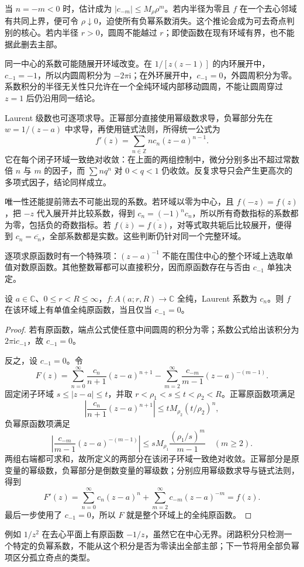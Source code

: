 当 \(n=-m<0\) 时，估计成为 \(|c_{-m}|\le M_\rho\rho^m\)。若内半径为零且 \(f\) 在一个去心邻域有共同上界，便可令 \(\rho\downarrow0\)，迫使所有负幂系数消失。这个推论会成为可去奇点判别的核心。若内半径 \(r>0\)，圆周不能越过 \(r\)；即使函数在现有环域有界，也不能据此删去主部。

\ProseParagraphBreak

同一中心的系数可能随展开环域改变。在 \(1/[z(z-1)]\) 的内环展开中，\(c_{-1}=-1\)，所以内圆周积分为 \(-2\pi\mathrm{i}\)；在外环展开中，\(c_{-1}=0\)，外圆周积分为零。系数积分的半径无关性只允许在一个全纯环域内部移动圆周，不能让圆周穿过 \(z=1\) 后仍沿用同一结论。

\ProseParagraphBreak

Laurent 级数也可逐项求导。正幂部分直接使用幂级数求导，负幂部分先在 \(w=1/(z-a)\) 中求导，再使用链式法则，所得统一公式为
\[
 f'(z)=\sum_{n\in\mathbb Z}n c_n(z-a)^{n-1}.
\]
它在每个闭子环域一致绝对收敛：在上面的两组控制中，微分分别多出不超过常数倍 \(n\) 与 \(m\) 的因子，而 \(\sum n q^n\) 对 \(0<q<1\) 仍收敛。反复求导只会产生更高次的多项式因子，结论同样成立。

\ProseParagraphBreak

唯一性还能提前筛去不可能出现的系数。若环域以零为中心，且 \(f(-z)=f(z)\)，把 \(-z\) 代入展开并比较系数，得到 \(c_n=(-1)^n c_n\)，所以所有奇数指标的系数都为零，包括负的奇数指标。若 \(f(\overline z)=\overline{f(z)}\)，对等式取共轭后比较展开，便得到 \(c_n=\overline{c_n}\)，全部系数都是实数。这些判断仍针对同一个完整环域。

\ProseParagraphBreak

逐项求原函数时有一个特殊项：\((z-a)^{-1}\) 不能在围住中心的整个环域上选取单值对数原函数。其他整数幂都可以直接积分，因而原函数存在与否由 \(c_{-1}\) 单独决定。

\begin{proposition}\label{b3:prop:03-annulus-primitive}
设 \(a\in\mathbb C\)、\(0\le r<R\le\infty\)，\(f:A(a;r,R)\to\mathbb C\) 全纯，Laurent 系数为 \(c_n\)。则 \(f\) 在该环域上有单值全纯原函数，当且仅当 \(c_{-1}=0\)。
\end{proposition}
\begin{proof}
若有原函数，端点公式使任意中间圆周的积分为零；系数公式给出该积分为 \(2\pi\mathrm{i}c_{-1}\)，故 \(c_{-1}=0\)。

反之，设 \(c_{-1}=0\)。令
\[
 F(z)=\sum_{n=0}^{\infty}\frac{c_n}{n+1}(z-a)^{n+1}
 -\sum_{m=2}^{\infty}\frac{c_{-m}}{m-1}(z-a)^{-(m-1)}.
\]
固定闭子环域 \(s\le|z-a|\le t\)，并取 \(r<\rho_1<s\le t<\rho_2<R\)。正幂原函数项满足
\[
 \left|\frac{c_n}{n+1}(z-a)^{n+1}\right|
 \le tM_{\rho_2}(t/\rho_2)^n,
\]
负幂原函数项满足
\[
 \left|\frac{c_{-m}}{m-1}(z-a)^{-(m-1)}\right|
 \le sM_{\rho_1}\frac{(\rho_1/s)^m}{m-1}
 \quad(m\ge2).
\]
两组右端都可求和，故所定义的两部分在该闭子环域一致绝对收敛。正幂部分是原变量的幂级数，负幂部分是倒数变量的幂级数；分别应用幂级数求导与链式法则，得到
\[
 F'(z)=\sum_{n=0}^{\infty}c_n(z-a)^n
 +\sum_{m=2}^{\infty}c_{-m}(z-a)^{-m}=f(z).
\]
最后一步使用了 \(c_{-1}=0\)，所以 \(F\) 就是整个环域上的全纯原函数。
\end{proof}

例如 \(1/z^2\) 在去心平面上有原函数 \(-1/z\)，虽然它在中心无界。闭路积分只检测一个特定的负幂系数，不能从这个积分是否为零读出全部主部；下一节将用全部负幂项区分孤立奇点的类型。
